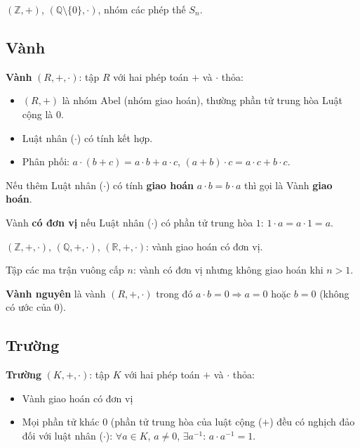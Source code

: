 \documentclass[12pt,a4paper]{article}
\begin{document}
\begin{vidu}
  $(\mathbb{Z}, +)$, $(\mathbb{Q} \setminus \{0\}, \cdot)$, nhóm các phép thế $S_n$.
\end{vidu}

\subsection{Vành}

\begin{dinhnghia}
  \textbf{Vành} $(R, +, \cdot)$: tập $R$ với hai phép toán $+$ và $\cdot$ thỏa:
  \begin{itemize}
    \item $(R, +)$ là nhóm Abel (nhóm giao hoán), thường phần tử trung hòa Luật cộng là $0$.
    \item Luật nhân ($\cdot$) có tính kết hợp.
    \item Phân phối: $a \cdot (b + c) = a \cdot b + a \cdot c$, $(a + b) \cdot c = a \cdot c + b \cdot c$.
  \end{itemize}
  Nếu thêm Luật nhân ($\cdot$) có tính \textbf{giao hoán} $a \cdot b = b \cdot a$ thì gọi là Vành \textbf{giao hoán}.
  
  Vành \textbf{có đơn vị} nếu Luật nhân ($\cdot$) có phần tử trung hòa $1$: $1 \cdot a = a \cdot 1 = a$.
\end{dinhnghia}

\begin{vidu}
  $(\mathbb{Z}, +, \cdot)$, $(\mathbb{Q}, +, \cdot)$, $(\mathbb{R}, +, \cdot)$: vành giao hoán có đơn vị. 
  
  Tập các ma trận vuông cấp $n$: vành có đơn vị nhưng không giao hoán khi $n > 1$.
\end{vidu}

\begin{dinhnghia}
  \textbf{Vành nguyên} là vành $(R, +, \cdot)$ trong đó $a \cdot b = 0 \Rightarrow a = 0$ hoặc $b = 0$ (không có ước của 0).
\end{dinhnghia}

\subsection{Trường}

\begin{dinhnghia}
  \textbf{Trường} $(K, +, \cdot)$: tập $K$ với hai phép toán $+$ và $\cdot$ thỏa:
  \begin{itemize}
    \item Vành giao hoán có đơn vị
    \item Mọi phần tử khác $0$ (phần tử trung hòa của luật cộng ($+$) đều có nghịch đảo đối với luật nhân ($\cdot$): $\forall a \in K$, $a \ne 0$, $\exists a^{-1}$: $a \cdot a^{-1} = 1$.
  \end{itemize}
\end{dinhnghia}
\end{document}
